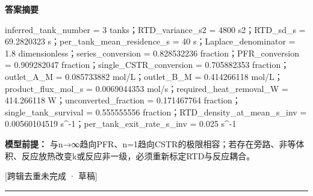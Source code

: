 \documentclass[UTF8,11pt,a4paper]{ctexart}
\begin{document}
\noindent\textbf{答案摘要}\par
inferred\_tank\_number = 3 tanks；RTD\_variance\_s2 = 4800 s2；RTD\_sd\_s = 69.2820323 s；per\_tank\_mean\_residence\_s = 40 s；Laplace\_denominator = 1.8 dimensionless；series\_conversion = 0.828532236 fraction；PFR\_conversion = 0.909282047 fraction；single\_CSTR\_conversion = 0.705882353 fraction；outlet\_A\_M = 0.085733882 mol/L；outlet\_B\_M = 0.414266118 mol/L；product\_flux\_mol\_s = 0.0069044353 mol/s；required\_heat\_removal\_W = 414.266118 W；unconverted\_fraction = 0.171467764 fraction；single\_tank\_survival = 0.555555556 fraction；RTD\_density\_at\_mean\_s\_inv = 0.00560104519 s\textasciicircum{}-1；per\_tank\_exit\_rate\_s\_inv = 0.025 s\textasciicircum{}-1\par
\noindent\textbf{模型前提：}
与n→∞趋向PFR、n=1趋向CSTR的极限相容；若存在旁路、非等体积、反应放热改变k或反应非一级，必须重新标定RTD与反应耦合。\par
\noindent\textcolor{red!65!black}{[跨辑去重未完成 · 草稿]} \par
\medskip\hrule\medskip
{}
\end{document}
